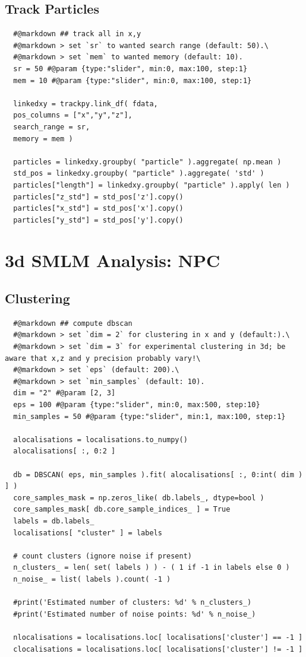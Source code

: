 \documentclass[11pt, a4paper, oneside, twocolumn]{report}
\begin{document}
\subsection{Track Particles}

\begin{verbatim}
  #@markdown ## track all in x,y
  #@markdown > set `sr` to wanted search range (default: 50).\
  #@markdown > set `mem` to wanted memory (default: 10).
  sr = 50 #@param {type:"slider", min:0, max:100, step:1}
  mem = 10 #@param {type:"slider", min:0, max:100, step:1}
  
  linkedxy = trackpy.link_df( fdata,
  pos_columns = ["x","y","z"],
  search_range = sr,
  memory = mem )
  
  particles = linkedxy.groupby( "particle" ).aggregate( np.mean )
  std_pos = linkedxy.groupby( "particle" ).aggregate( 'std' )
  particles["length"] = linkedxy.groupby( "particle" ).apply( len )
  particles["z_std"] = std_pos['z'].copy()
  particles["x_std"] = std_pos['x'].copy()
  particles["y_std"] = std_pos['y'].copy()
\end{verbatim}


\clearpage\section{3d SMLM Analysis: NPC}

\subsection{Clustering}

\begin{verbatim}
  #@markdown ## compute dbscan
  #@markdown > set `dim = 2` for clustering in x and y (default:).\
  #@markdown > set `dim = 3` for experimental clustering in 3d; be aware that x,z and y precision probably vary!\
  #@markdown > set `eps` (default: 200).\
  #@markdown > set `min_samples` (default: 10).
  dim = "2" #@param [2, 3]
  eps = 100 #@param {type:"slider", min:0, max:500, step:10}
  min_samples = 50 #@param {type:"slider", min:1, max:100, step:1}

  alocalisations = localisations.to_numpy()
  alocalisations[ :, 0:2 ]

  db = DBSCAN( eps, min_samples ).fit( alocalisations[ :, 0:int( dim ) ] )
  core_samples_mask = np.zeros_like( db.labels_, dtype=bool )
  core_samples_mask[ db.core_sample_indices_ ] = True
  labels = db.labels_
  localisations[ "cluster" ] = labels

  # count clusters (ignore noise if present)
  n_clusters_ = len( set( labels ) ) - ( 1 if -1 in labels else 0 )
  n_noise_ = list( labels ).count( -1 )

  #print('Estimated number of clusters: %d' % n_clusters_)
  #print('Estimated number of noise points: %d' % n_noise_)

  nlocalisations = localisations.loc[ localisations['cluster'] == -1 ]
  clocalisations = localisations.loc[ localisations['cluster'] != -1 ]
\end{verbatim}
\end{document}
